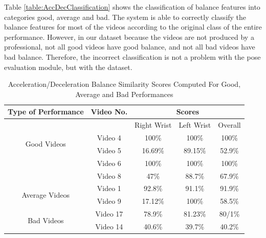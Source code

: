   Table \ref{table:AccDecClassification} shows the classification of balance features into categories good, average and bad. The system is able to correctly classify the balance features for most of the videos according to the original class of the entire performance. However, in our dataset because the videos are not produced by a professional, not all good videos have good balance, and not all bad videos have bad balance. Therefore, the incorrect classification is not a problem with the pose evaluation module, but with the dataset.

\begin{table}
  \centering
  \begin{tabular}{|c|c|c|c|c|}
    \hline
    Type of Performance & Video No. & \multicolumn{3}{c}{Scores}   \\
        \hline
        \hline
         {} & {} & Right Wrist & Left Wrist & Overall \\
        \hline
        \multirow{2}{*}{Good Videos} 
          & Video 4 & 100\% & 100\% & 100\%  \\ \cline{2-5}
          & Video 5 & 16.69\% & 89.15\% & 52.9\% \\ \cline{2-5}
          & Video 6 & 100\% & 100\% & 100\%  \\ \cline{2-5}
          & Video 8 & 47\% & 88.7\% & 67.9\% \\ \cline{2-5}
          \hline

          \multirow{2}{*}{Average Videos} 
          & Video 1 & 92.8\% & 91.1\% & 91.9\% \\ \cline{2-5}
          & Video 9 & 17.12\% & 100\% & 58.5\% \\ \cline{2-5}
          \hline

          \multirow{2}{*}{Bad Videos} 
          & Video 17 & 78.9\% & 81.23\% & 80/1\%  \\ \cline{2-5}
          & Video 14 & 40.6\% & 39.7\% & 40.2\% \\ \cline{2-5}
          \hline
  \end{tabular}
\caption{Acceleration/Deceleration Balance Similarity Scores Computed For Good, Average and Bad Performances}
\label{table:AccDecScores}
\end{table}

